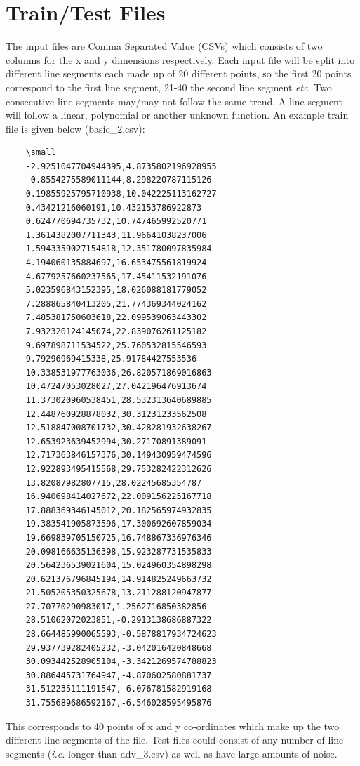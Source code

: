 \documentclass[12pt]{article}
\begin{document}
\section{Train/Test Files}
\label{sec:train_files}
The input files are Comma Separated Value (CSVs) which consists of two columns for the x and y dimensions respectively.
Each input file will be split into different line segments each made up of 20 different points, so the first 20 points correspond to the first line segment, 21-40 the second line segment \textit{etc}.
Two consecutive line segments may/may not follow the same trend.
A line segment will follow a linear, polynomial or another unknown function.
An example train file is given below (basic\_2.csv): 

\begin{verbatim}
    \small
    -2.9251047704944395,4.8735802196928955
    -0.8554275589011144,8.298220787115126
    0.19855925795710938,10.042225113162727
    0.43421216060191,10.432153786922873
    0.624770694735732,10.747465992520771
    1.3614382007711343,11.96641038237006
    1.5943359027154818,12.351780097835984
    4.194060135884697,16.653475561819924
    4.6779257660237565,17.45411532191076
    5.023596843152395,18.026088181779052
    7.288865840413205,21.774369344024162
    7.485381750603618,22.099539063443302
    7.932320124145074,22.839076261125182
    9.697898711534522,25.760532815546593
    9.79296969415338,25.91784427553536
    10.338531977763036,26.820571869016863
    10.47247053028027,27.042196476913674
    11.373020960538451,28.532313640689885
    12.448760928878032,30.31231233562508
    12.518847008701732,30.428281932638267
    12.653923639452994,30.27170891389091
    12.717363846157376,30.149430959474596
    12.922893495415568,29.753282422312626
    13.82087982807715,28.02245685354787
    16.940698414027672,22.009156225167718
    17.888369346145012,20.182565974932835
    19.383541905873596,17.300692607859034
    19.669839705150725,16.748867336976346
    20.098166635136398,15.923287731535833
    20.564236539021604,15.024960354898298
    20.621376796845194,14.914825249663732
    21.505205350325678,13.211288120947877
    27.70770290983017,1.2562716850382856
    28.51062072023851,-0.2913138686887322
    28.664485990065593,-0.5878817934724623
    29.937739282405232,-3.042016420848668
    30.093442528905104,-3.3421269574788823
    30.886445731764947,-4.870602580881737
    31.512235111191547,-6.076781582919168
    31.755689686592167,-6.546028595495876
\end{verbatim}

This corresponds to 40 points of x and y co-ordinates which make up the two different line segments of the file. 
Test files could consist of any number of line segments (\textit{i.e.} longer than adv\_3.csv) as well as have large amounts of noise. 
\end{document}
